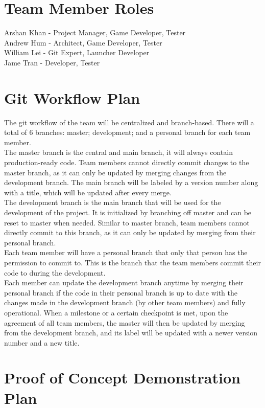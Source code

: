 \documentclass{article}
\begin{document}
\section{Team Member Roles}

Arshan Khan - Project Manager, Game Developer, Tester \\
Andrew Hum - Architect, Game Developer, Tester \\
William Lei - Git Expert, Launcher Developer \\
Jame Tran - Developer, Tester

\section{Git Workflow Plan}

The git workflow of the team will be centralized and branch-based. There will a total of 6 branches: master; development; and a personal branch for each team member.\\
The master branch is the central and main branch, it will always contain production-ready code. Team members cannot directly commit changes to the master branch, as it can only be updated by merging changes from the development branch. The main branch will be labeled by a version number along with a title, which will be updated after every merge.\\
The development branch is the main branch that will be used for the development of the project. It is initialized by branching off master and can be reset to master when needed. Similar to master branch, team members cannot directly commit to this branch, as it can only be updated by merging from their personal branch.\\
Each team member will have a personal branch that only that person has the permission to commit to. This is the branch that the team members commit their code to during the development.\\
Each member can update the development branch anytime by merging their personal branch if the code in their personal branch is up to date with the changes made in the development branch (by other team members) and fully operational. When a milestone or a certain checkpoint is met, upon the agreement of all team members, the master will then be updated by merging from the development branch, and its label will be updated with a newer version number and a new title.

\section{Proof of Concept Demonstration Plan}
\end{document}
